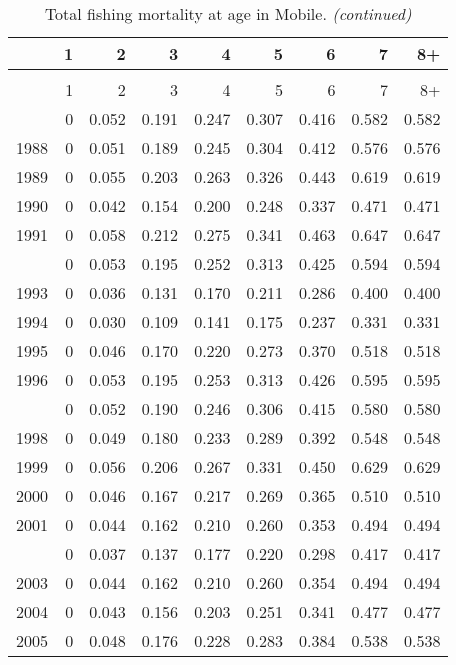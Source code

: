 \documentclass[
]{article}
\begin{document}
\begin{longtable}[t]{lrrrrrrrr}
\caption{\label{tab:Mobile-fleet-FAA-table}Total fishing mortality at age in Mobile.}\\
\toprule
  & 1 & 2 & 3 & 4 & 5 & 6 & 7 & 8+\\
\midrule
\endfirsthead
\caption[]{Total fishing mortality at age in Mobile. \textit{(continued)}}\\
\toprule
  & 1 & 2 & 3 & 4 & 5 & 6 & 7 & 8+\\
\midrule
\endhead

\endfoot
\bottomrule
\endlastfoot
1987 & 0 & 0.052 & 0.191 & 0.247 & 0.307 & 0.416 & 0.582 & 0.582\\
1988 & 0 & 0.051 & 0.189 & 0.245 & 0.304 & 0.412 & 0.576 & 0.576\\
1989 & 0 & 0.055 & 0.203 & 0.263 & 0.326 & 0.443 & 0.619 & 0.619\\
1990 & 0 & 0.042 & 0.154 & 0.200 & 0.248 & 0.337 & 0.471 & 0.471\\
1991 & 0 & 0.058 & 0.212 & 0.275 & 0.341 & 0.463 & 0.647 & 0.647\\
\addlinespace
1992 & 0 & 0.053 & 0.195 & 0.252 & 0.313 & 0.425 & 0.594 & 0.594\\
1993 & 0 & 0.036 & 0.131 & 0.170 & 0.211 & 0.286 & 0.400 & 0.400\\
1994 & 0 & 0.030 & 0.109 & 0.141 & 0.175 & 0.237 & 0.331 & 0.331\\
1995 & 0 & 0.046 & 0.170 & 0.220 & 0.273 & 0.370 & 0.518 & 0.518\\
1996 & 0 & 0.053 & 0.195 & 0.253 & 0.313 & 0.426 & 0.595 & 0.595\\
\addlinespace
1997 & 0 & 0.052 & 0.190 & 0.246 & 0.306 & 0.415 & 0.580 & 0.580\\
1998 & 0 & 0.049 & 0.180 & 0.233 & 0.289 & 0.392 & 0.548 & 0.548\\
1999 & 0 & 0.056 & 0.206 & 0.267 & 0.331 & 0.450 & 0.629 & 0.629\\
2000 & 0 & 0.046 & 0.167 & 0.217 & 0.269 & 0.365 & 0.510 & 0.510\\
2001 & 0 & 0.044 & 0.162 & 0.210 & 0.260 & 0.353 & 0.494 & 0.494\\
\addlinespace
2002 & 0 & 0.037 & 0.137 & 0.177 & 0.220 & 0.298 & 0.417 & 0.417\\
2003 & 0 & 0.044 & 0.162 & 0.210 & 0.260 & 0.354 & 0.494 & 0.494\\
2004 & 0 & 0.043 & 0.156 & 0.203 & 0.251 & 0.341 & 0.477 & 0.477\\
2005 & 0 & 0.048 & 0.176 & 0.228 & 0.283 & 0.384 & 0.538 & 0.538\\

\end{longtable}
\end{document}
